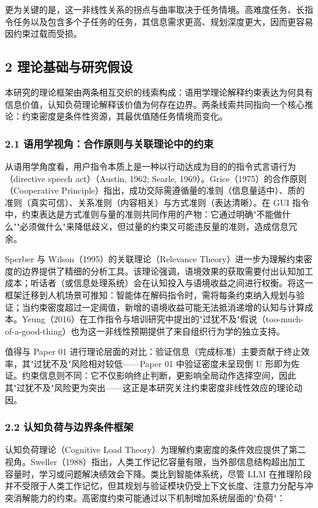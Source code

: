 \documentclass[12pt,a4paper,openany,oneside]{ctexrep}
\begin{document}
更为关键的是，这一非线性关系的拐点与曲率取决于任务情境。高难度任务、长指令任务以及包含多个子任务的任务，其信息需求更高、规划深度更大，因而更容易因约束过载而受损。

\subsection{2 理论基础与研究假设}


本研究的理论框架由两条相互交织的线索构成：语用学理论解释约束表达为何具有信息价值，认知负荷理论解释该价值为何存在边界。两条线索共同指向一个核心推论：约束密度是条件性资源，其最优值随任务情境而变化。

\subsubsection{2.1 语用学视角：合作原则与关联理论中的约束}


从语用学角度看，用户指令本质上是一种以行动达成为目的的指令式言语行为（directive speech act）（Austin, 1962; Searle, 1969）。Grice（1975）的合作原则（Cooperative Principle）指出，成功交际需遵循量的准则（信息量适中）、质的准则（真实可信）、关系准则（内容相关）与方式准则（表达清晰）。在 GUI 指令中，约束表达是方式准则与量的准则共同作用的产物：它通过明确"不能做什么""必须做什么"来降低歧义，但过量的约束又可能违反量的准则，造成信息冗余。

Sperber 与 Wilson（1995）的关联理论（Relevance Theory）进一步为理解约束密度的边界提供了精细的分析工具。该理论强调，语境效果的获取需要付出认知加工成本；听话者（或信息处理系统）会在认知投入与语境收益之间进行权衡。将这一框架迁移到人机场景可推知：智能体在解码指令时，需将每条约束纳入规划与验证；当约束密度超过一定阈值，新增的语境收益可能无法抵消递增的认知与计算成本。Yeung（2016）在工作指令与培训研究中提出的"过犹不及"假说（too-much-of-a-good-thing）也为这一非线性预期提供了来自组织行为学的独立支持。

值得与 Paper 01 进行理论层面的对比：验证信息（完成标准）主要贡献于终止效率，其"过犹不及"风险相对较低——Paper 01 中验证密度未呈现倒 U 形即为佐证。约束信息则不同：它不仅影响终止判断，更影响全局动作选择空间，因此其"过犹不及"风险更为突出——这正是本研究关注约束密度非线性效应的理论动因。

\subsubsection{2.2 认知负荷与边界条件框架}


认知负荷理论（Cognitive Load Theory）为理解约束密度的条件效应提供了第二视角。Sweller（1988）指出，人类工作记忆容量有限，当外部信息结构超出加工容量时，学习或问题解决绩效会下降。类比到智能体系统，尽管 LLM 在推理阶段并不受限于人类工作记忆，但其规划与验证模块仍受上下文长度、注意力分配与冲突消解能力的约束。高密度约束可能通过以下机制增加系统层面的"负荷"：
\end{document}
